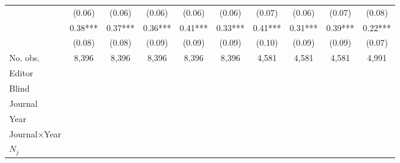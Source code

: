 \begin{table}
\begin{threeparttable}
\begin{tabular}{p{3cm}S@{}S@{}S@{}S@{}S@{}S@{}S@{}S@{}S@{}}
                                          &      (0.06)   &      (0.06)   &      (0.06)   &      (0.06)   &      (0.06)   &      (0.07)   &      (0.06)   &      (0.07)   &      (0.08)   \\
            &        0.38***&        0.37***&        0.36***&        0.41***&        0.33***&        0.41***&        0.31***&        0.39***&        0.22***\\
                                          &      (0.08)   &      (0.08)   &      (0.09)   &      (0.09)   &      (0.09)   &      (0.10)   &      (0.09)   &      (0.09)   &      (0.07)   \\
            \midrule
            No. obs.                      &       8,396   &       8,396   &       8,396   &       8,396   &       8,396   &       4,581   &       4,581   &       4,581   &       4,991   \\
            \midrule
            Editor                &           {}   &           {}   &           {}   &           {}   &           {}   &           {}   &           {}   &           {}   &           {}   \\
            Blind                         &           {}   &           {}   &           {}   &           {}   &           {}   &           {}   &           {}   &           {}   &           {}   \\
            Journal                       &           {}   &           {}   &               &               &               &               &               &               &               \\
            Year                          &               &           {}   &               &               &               &               &               &               &               \\
            Journal\(\times\)Year                  &               &               &           {}   &           {}   &           {}   &           {}   &           {}   &           {}   &           {}   \\
            \(N_j\)                       &               &               &               &           {}   &           {}   &           {}   &           {}   &           {}   &           {}   \\

\end{tabular}
\end{threeparttable}
\end{table}
